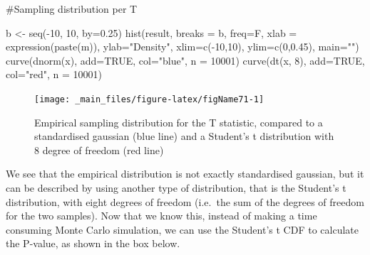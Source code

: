 \documentclass[a4paper,12pt,oneside]{book}
\newenvironment{Shaded}{\begin{snugshade}}{\end{snugshade}}
\newcommand{\DecValTok}[1]{#1}
\newcommand{\FloatTok}[1]{#1}
\newcommand{\ConstantTok}[1]{#1}
\newcommand{\SpecialCharTok}[1]{#1}
\newcommand{\StringTok}[1]{#1}
\newcommand{\CommentTok}[1]{#1}
\newcommand{\OtherTok}[1]{#1}
\newcommand{\FunctionTok}[1]{#1}
\newcommand{\AttributeTok}[1]{#1}
\newcommand{\NormalTok}[1]{#1}
\begin{document}
\begin{Shaded}
\begin{Highlighting}[]
\CommentTok{\#Sampling distribution per T }

\NormalTok{b }\OtherTok{\textless{}{-}} \FunctionTok{seq}\NormalTok{(}\SpecialCharTok{{-}}\DecValTok{10}\NormalTok{, }\DecValTok{10}\NormalTok{, }\AttributeTok{by=}\FloatTok{0.25}\NormalTok{)}
\FunctionTok{hist}\NormalTok{(result, }\AttributeTok{breaks =}\NormalTok{ b, }\AttributeTok{freq=}\NormalTok{F, }
  \AttributeTok{xlab =} \FunctionTok{expression}\NormalTok{(}\FunctionTok{paste}\NormalTok{(m)), }\AttributeTok{ylab=}\StringTok{"Density"}\NormalTok{, }
  \AttributeTok{xlim=}\FunctionTok{c}\NormalTok{(}\SpecialCharTok{{-}}\DecValTok{10}\NormalTok{,}\DecValTok{10}\NormalTok{), }\AttributeTok{ylim=}\FunctionTok{c}\NormalTok{(}\DecValTok{0}\NormalTok{,}\FloatTok{0.45}\NormalTok{), }\AttributeTok{main=}\StringTok{""}\NormalTok{)}
\FunctionTok{curve}\NormalTok{(}\FunctionTok{dnorm}\NormalTok{(x), }\AttributeTok{add=}\ConstantTok{TRUE}\NormalTok{, }\AttributeTok{col=}\StringTok{"blue"}\NormalTok{, }\AttributeTok{n =} \DecValTok{10001}\NormalTok{)}
\FunctionTok{curve}\NormalTok{(}\FunctionTok{dt}\NormalTok{(x, }\DecValTok{8}\NormalTok{), }\AttributeTok{add=}\ConstantTok{TRUE}\NormalTok{, }\AttributeTok{col=}\StringTok{"red"}\NormalTok{, }\AttributeTok{n =} \DecValTok{10001}\NormalTok{)}
\end{Highlighting}
\end{Shaded}

\begin{figure}

{\centering \texttt{[image: \_main\_files/figure-latex/figName71-1]} 

}

\caption{Empirical sampling distribution for the T statistic, compared to a standardised gaussian (blue line) and a Student's t distribution with 8 degree of freedom (red line)}\label{fig:figName71}
\end{figure}

We see that the empirical distribution is not exactly standardised gaussian, but it can be described by using another type of distribution, that is the Student's t distribution, with eight degrees of freedom (i.e.~the sum of the degrees of freedom for the two samples). Now that we know this, instead of making a time consuming Monte Carlo simulation, we can use the Student's t CDF to calculate the P-value, as shown in the box below.
\end{document}
